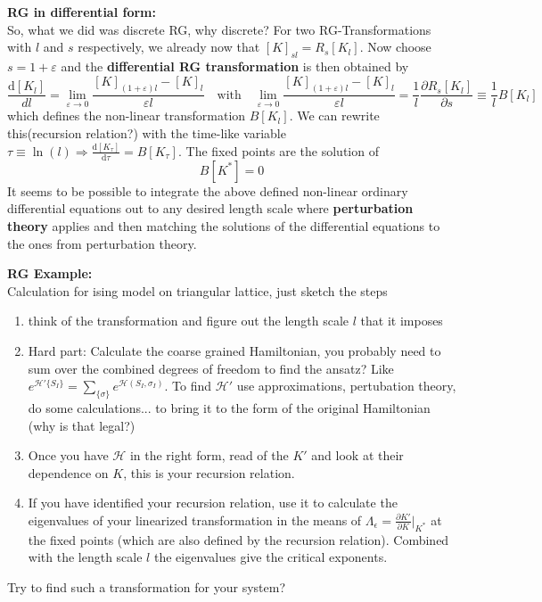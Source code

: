 	\textbf{RG in differential form:} \\
	So, what we did was discrete RG, why discrete?
	For two RG-Transformations with $l$ and $s$ respectively, we already now that $[K]_{sl} =	R_s [K_l]$. Now choose $s =	1 + \varepsilon$ and the \textbf{differential RG transformation} is then obtained by
	\begin{equation}
		\frac{\text{d}[K_l]}{dl} =	\lim_{\varepsilon \rightarrow 0} \frac{[K]_{(1 + \varepsilon)l} - [K]_l}{\varepsilon l} \quad \text{with} \quad \lim_{\varepsilon \rightarrow 0} \frac{[K]_{(1 + \varepsilon)l} - [K]_l}{\varepsilon l} =	\frac{1}{l} \frac{\partial R_s[K_l]}{\partial s} \equiv \frac{1}{l} B [K_l]
	\end{equation}
	which defines the non-linear transformation $B[K_l]$. We can rewrite this(recursion relation?) with the time-like variable $\tau \equiv \ln (l) \Rightarrow \frac{\text{d}[K_\tau]}{\text{d} \tau} =	B[K_\tau]$. The fixed points are the solution of
	\begin{equation}
		B[K^*] =	0
	\end{equation}
	It seems to be possible to integrate the above defined non-linear ordinary differential equations out to any desired length scale where \textbf{perturbation theory} applies and then matching the solutions of the differential equations to the ones from perturbation theory.
	
	\textbf{RG Example:} \\
	Calculation for ising model on triangular lattice, just sketch the steps
	\begin{enumerate}
		\item	think of the transformation and figure out the length scale $l$ that it imposes
		\item Hard part:	Calculate the coarse grained Hamiltonian, you probably need to sum over the combined degrees of freedom to find the ansatz? Like $e^{\mathcal{H}'\lbrace S_I \rbrace} =	\sum_{\lbrace \sigma \rbrace} e^{\mathcal{H}(S_I, \sigma_I)}$. To find $\mathcal{H}'$ use approximations, pertubation theory, do some calculations... to bring it to the form of the original Hamiltonian (why is that legal?)
		\item Once you have $\mathcal{H}$ in the right form, read of the $K'$ and look at their dependence on $K$, this is your recursion relation.
		\item If you have identified your recursion relation, use it to calculate the eigenvalues of your linearized transformation in the means of $\Lambda_\epsilon =	\frac{\partial K'}{\partial K} \big|_{K^*}$ at the fixed points (which are also defined by the recursion relation). Combined with the length scale $l$ the eigenvalues give the critical exponents.
	\end{enumerate}
	Try to find such a transformation for your system?
	
